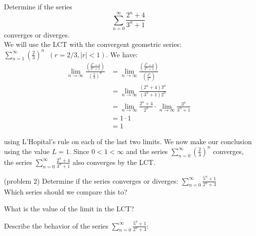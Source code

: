 \documentclass[handout]{ximera}
\begin{document}
\begin{example}[example 2]
Determine if the series 
\[
\sum_{n=0}^\infty \frac{2^n + 4}{3^n + 1}
\]
converges or diverges.\\
We will use the LCT with the convergent geometric 
series: $\displaystyle{\sum_{n=1}^\infty \left(\frac23\right)^n \;\;(r = 2/3, |r| < 1)}$. 
We have:
\begin{align*}
\lim_{n \to \infty} \frac{\left(\frac{2^n + 4}{3^n + 1}\right)}{\left(\frac23\right)^n} &= \lim_{n \to \infty} \frac{\left(\frac{2^n + 4}{3^n + 1}\right)}{\left(\frac{2^n}{3^n}\right)}\\
&=\lim_{n \to \infty} \frac{(2^n + 4)3^n}{(3^n + 1)2^n}\\
&= \lim_{n \to \infty} \frac{2^n + 4}{2^n} \cdot \lim_{n \to \infty}\frac{3^n}{3^n + 1}\\
&= 1 \cdot 1 \\
&= 1
\end{align*}

using L'Hopital's rule on each of the last two limits. We now make our conclusion using the value $L = 1$. Since $0 < 1 < \infty$ and the series $\displaystyle{\sum_{n=0}^\infty \left(\frac23\right)^n}$
converges, the series $\displaystyle{\sum_{n=0}^\infty \frac{2^n + 4}{3^n + 1}}$ also converges by the LCT.
\end{example}




\begin{problem}(problem 2)
Determine if the series converges or diverges: $\displaystyle{\sum_{n=0}^\infty \frac{5^n + 1}{2^n + 3}}$\\
Which series should we compare this to?

\begin{multipleChoice}
\end{multipleChoice}

What is the value of the limit in the LCT?
\begin{multipleChoice}
\end{multipleChoice}

Describe the behavior of the series $\displaystyle{\sum_{n=0}^\infty \frac{5^n + 1}{2^n + 3}:}$
\begin{multipleChoice}
\end{multipleChoice}

\end{problem}
\end{document}
